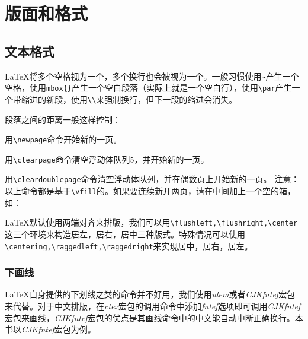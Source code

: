 {\let\clearpage\relax \chapter{版面和格式}}

\section{文本格式}

\LaTeX 将多个空格视为一个，多个换行也会被视为一个。一般习惯使用\lstinline|~|产生一个空格，使用\lstinline|mbox{}|产生一个空白段落（实际上就是一个空白行），使用\lstinline|\par|产生一个带缩进的新段，使用\lstinline|\\|来强制换行，但下一段的缩进会消失。

段落之间的距离一般这样控制：

\begin{latex}
\setlength{\parskip}{0pt plus 1pt}%
\end{latex}

用\lstinline|\newpage|命令开始新的一页。

用\lstinline|\clearpage|命令清空浮动体队列5，并开始新的一页。

用\lstinline|\cleardoublepage|命令清空浮动体队列，并在偶数页上开始新的一页。
注意：以上命令都是基于\lstinline|\vfill|的。如果要连续新开两页，请在中间加上一个空的箱，如：

\begin{latex}
\newpage\mbox{}\newpage
\end{latex}

\LaTeX 默认使用两端对齐来排版，我们可以用\lstinline|\flushleft,\flushright,\center|这三个环境来构造居左，居右，居中三种版式。特殊情况可以使用\lstinline|\centering,\raggedleft,\raggedright|来实现居中，居右，居左。

\subsection{下画线}

\LaTeX 自身提供的下划线之类的命令并不好用，我们使用\emph{ulem}或者\emph{CJKfntef}宏包来代替。对于中文排版，在\emph{ctex}宏包的调用命令中添加\emph{fntef}选项即可调用\emph{CJKfntef}宏包来画线，\emph{CJKfntef}宏包的优点是其画线命令中的中文能自动中断正确换行。本书以\emph{CJKfntef}宏包为例。

\begin{codeshow}
\\
\\
\\
\\
\\
\end{codeshow}

